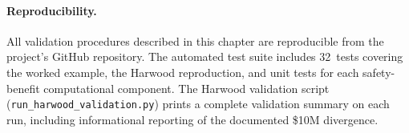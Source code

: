 \paragraph{Reproducibility.} All validation procedures described in this
chapter are reproducible from the project's GitHub repository. The
automated test suite includes 32~tests covering the worked example, the
Harwood reproduction, and unit tests for each safety-benefit computational
component. The Harwood validation script
(\texttt{run\_harwood\_validation.py}) prints a complete validation summary
on each run, including informational reporting of the documented \$10M
divergence.




